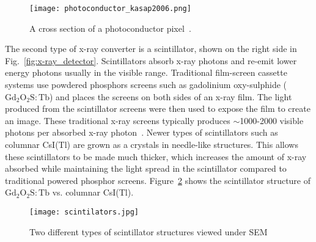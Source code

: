 \begin{figure}[h]
\centering
\texttt{[image: photoconductor\_kasap2006.png]}
\caption{A cross section of a photoconductor pixel~\citep{kasap2006}.}
\label{fig:photoconductor_cross_section}
\end{figure}

The second type of x-ray converter is a scintillator, shown on the right side in Fig.~\ref{fig:x-ray_detector}.  Scintillators absorb x-ray photons and re-emit lower energy photons usually in the visible range.  Traditional film-screen cassette systems use powdered phosphors screens such as gadolinium oxy-sulphide ($\mathrm{Gd_2O_2S:Tb}$) and places the screens on both sides of an x-ray film.  The light produced from the scintillator screens were then used to expose the film to create an image.  These traditional x-ray screens typically produces $\sim$1000-2000 visible photons per absorbed x-ray photon~\citep{trauernicht1988, trauernicht1990}. Newer types of scintillators such as columnar CsI(Tl) are grown as a crystals in needle-like structures.  This allows these scintillators to be made much thicker, which increases the amount of x-ray absorbed while maintaining the light spread in the scintillator compared to traditional powered phosphor screens.  Figure~\ref{fig:scintillators} shows the scintillator structure of $\mathrm{Gd_2O_2S:Tb}$ vs. columnar CsI(Tl).

\begin{figure}[h]
\texttt{[image: scintilators.jpg]}
\caption{Two different types of scintillator structures viewed under SEM~\citep{scintillatorImage}}
\label{fig:scintillators}
\end{figure}


